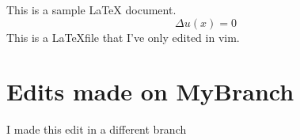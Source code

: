 \documentclass[11pt,letterpaper]{article}
\begin{document}
	This is a sample LaTeX document.
	\begin{equation} \Delta u(x)=0\end{equation}
	This is a \LaTeX file that I've only edited in vim.

	\section{Edits made on MyBranch}
	I made this edit in a different branch
\end{document}
